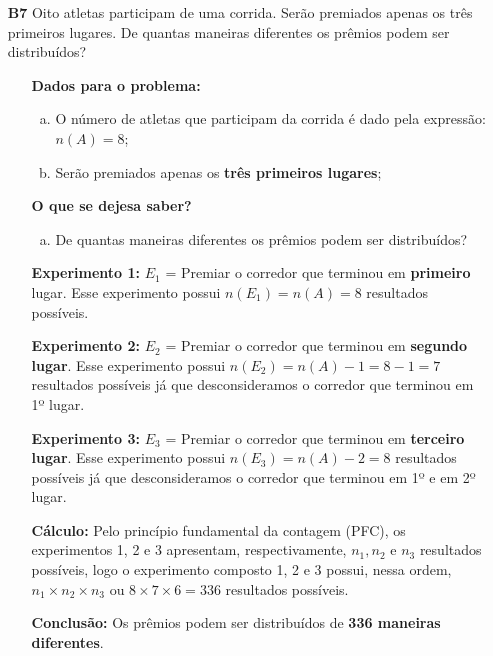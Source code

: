 \documentclass[a4paper,12pt]{article}
\begin{document}
\begin{enumerate}
\item[\textbf{B7}] Oito atletas participam de uma corrida. Serão premiados apenas os três primeiros lugares. De quantas maneiras diferentes os prêmios podem ser distribuídos?
 \begin{itemize}
     \item[\ding{172}] \textbf{Dados para o problema:}
        \begin{enumerate}[a)]
          \item O número de atletas que participam da corrida é dado pela expressão: $n(A)= 8$;
          \item Serão premiados apenas os \textbf{três primeiros lugares};          
        \end{enumerate}     
     \item[\ding{173}] \textbf{O que se dejesa saber?}
        \begin{enumerate}[a)]
          \item De quantas maneiras diferentes os prêmios podem ser distribuídos?
        \end{enumerate}
     \item[\ding{174}] \textbf{Experimento 1:} $E_1$ = Premiar o corredor que terminou em \textbf{primeiro} lugar. Esse experimento possui $n(E_1) =n(A) = 8$ resultados possíveis.
     \item[\ding{175}] \textbf{Experimento 2:} $E_2$ = Premiar o corredor que terminou em \textbf{segundo lugar}. Esse experimento possui $n(E_2) =n(A) - 1 = 8 - 1 = 7$ resultados possíveis já que desconsideramos o corredor que terminou em 1º lugar.
     \item[\ding{176}] \textbf{Experimento 3:} $E_3$ = Premiar o corredor que terminou em \textbf{terceiro lugar}. Esse experimento possui $n(E_3) =n(A) - 2 = 8$ resultados possíveis já que desconsideramos o corredor que terminou em 1º e em 2º lugar.
     \item[\ding{177}] \textbf{Cálculo:} Pelo princípio fundamental da contagem (PFC), os experimentos 1, 2 e 3 apresentam, respectivamente, $n_{1}, n_{2} \textrm{ e } n_{3}$ resultados possíveis, logo o experimento composto 1, 2 e 3 possui, nessa ordem, $n_{1} \times n_{2} \times n_{3}$ ou $8 \times 7 \times 6 = 336$ resultados possíveis.
     \item[\ding{178}] \textbf{Conclusão:} Os prêmios podem ser distribuídos de \textbf{336 maneiras diferentes}.
   \end{itemize}


\end{enumerate}
\end{document}

